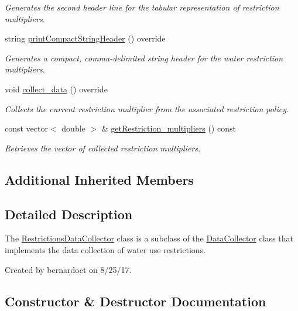 \begin{DoxyCompactItemize}
\begin{DoxyCompactList}\small\item\em Generates the second header line for the tabular representation of restriction multipliers. \end{DoxyCompactList}\item 
string \mbox{\hyperlink{classRestrictionsDataCollector_ad36ff12a666d72c92893c918715628f6}{print\+Compact\+String\+Header}} () override
\begin{DoxyCompactList}\small\item\em Generates a compact, comma-\/delimited string header for the water restriction multipliers. \end{DoxyCompactList}\item 
void \mbox{\hyperlink{classRestrictionsDataCollector_a7d8b6433ec25a53ed50577c2cf89912d}{collect\+\_\+data}} () override
\begin{DoxyCompactList}\small\item\em Collects the current restriction multiplier from the associated restriction policy. \end{DoxyCompactList}\item 
const vector$<$ double $>$ \& \mbox{\hyperlink{classRestrictionsDataCollector_a576be619485a838e9496fea66181cd06}{get\+Restriction\+\_\+multipliers}} () const
\begin{DoxyCompactList}\small\item\em Retrieves the vector of collected restriction multipliers. \end{DoxyCompactList}\end{DoxyCompactItemize}
\subsection*{Additional Inherited Members}


\subsection{Detailed Description}
The {\ttfamily \mbox{\hyperlink{classRestrictionsDataCollector}{Restrictions\+Data\+Collector}}} class is a subclass of the {\ttfamily \mbox{\hyperlink{classDataCollector}{Data\+Collector}}} class that implements the data collection of water use restrictions. 

Created by bernardoct on 8/25/17. 

\subsection{Constructor \& Destructor Documentation}
\mbox{\label{classRestrictionsDataCollector_a0e700f013442a6df86fe75bcee4c31df}} 
